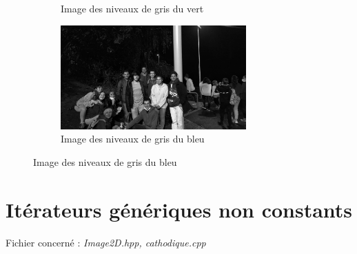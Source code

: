 \documentclass[a4paper,10pt]{article}
\begin{document}
\begin{figure}[h]
\begin{subfigure}{0.6\textwidth}
    \caption{Image des niveaux de gris du vert}
    \label{fig:patinoireGreen}
    \end{subfigure}
     \begin{subfigure}{0.6\textwidth}
    \includegraphics[width=1\linewidth, height=4cm]{patinoire_blue}   
    \caption{Image des niveaux de gris du bleu}
    \label{fig:patinoireBlue}
    \end{subfigure}
    \end{figure}
    \pagebreak
    \section{Itérateurs génériques non constants}
    Fichier concerné : \emph{Image2D.hpp, cathodique.cpp}
\end{document}
